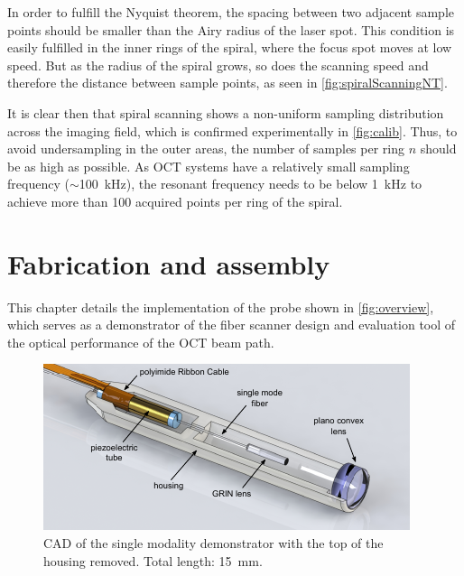 \documentclass[10pt]{iopart}
\begin{document}
In order to fulfill the Nyquist theorem, the spacing between two adjacent sample points should be smaller than the Airy radius of the laser spot. This condition is easily fulfilled in the inner rings of the spiral, where the focus spot moves at low speed. But as the radius of the spiral grows, so does the scanning speed and therefore the distance between sample points, as seen in \autoref{fig:spiralScanningNT}.

It is clear then that spiral scanning shows a non-uniform sampling distribution across the imaging field, which is confirmed experimentally in \autoref{fig:calib}. Thus, to avoid undersampling in the outer areas, the number of samples per ring $n$ should be as high as possible. As OCT systems have a relatively small sampling frequency ($\sim$\SI{100}{\kilo\hertz}), the resonant frequency needs to be below \SI{1}{kHz} to achieve more than 100 acquired points per ring of the spiral.



\section{Fabrication and assembly}


This chapter details the implementation of the probe shown in \autoref{fig:overview}, which serves as a demonstrator of the fiber scanner design and evaluation tool of the optical performance of the OCT beam path.

\begin{figure}[h!]\centering 
\includegraphics[width=\columnwidth]{figures/overview.pdf}
      \caption{CAD of the single modality demonstrator with the top of the housing removed. Total length: \SI{15}{\milli\meter}.}
      \label{fig:overview}
\end{figure}
\end{document}
